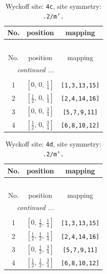 \documentclass[fleqn,8pt]{jsarticle}
\begin{document}
\renewcommand{\arraystretch}{1.2}
\begin{longtable}{ccc}
\caption{Wyckoff site: {\tt 4c}, site symmetry: {\tt .2/m'.}}
 \\
 \hline \hline
No. & position & mapping \\ \hline \endfirsthead

\multicolumn{2}{l}{\tablename\ \thetable{}} \\
 \hline \hline
No. & position & mapping \\ \hline \endhead

 \hline \hline
\multicolumn{2}{r}{\footnotesize\it continued ...} \\ \endfoot

 \hline \hline
\multicolumn{2}{r}{} \\ \endlastfoot

1 & $\left[ 0,\, 0,\, \frac{1}{4} \right]$ & {\tt [1,3,13,15]} \\ \hline
2 & $\left[ \frac{1}{2},\, 0,\, \frac{1}{4} \right]$ & {\tt [2,4,14,16]} \\ \hline
3 & $\left[ 0,\, 0,\, \frac{3}{4} \right]$ & {\tt [5,7,9,11]} \\ \hline
4 & $\left[ \frac{1}{2},\, 0,\, \frac{3}{4} \right]$ & {\tt [6,8,10,12]} \\
\end{longtable}
\renewcommand{\arraystretch}{1.2}
\begin{longtable}{ccc}
\caption{Wyckoff site: {\tt 4d}, site symmetry: {\tt .2/m'.}}
 \\
 \hline \hline
No. & position & mapping \\ \hline \endfirsthead

\multicolumn{2}{l}{\tablename\ \thetable{}} \\
 \hline \hline
No. & position & mapping \\ \hline \endhead

 \hline \hline
\multicolumn{2}{r}{\footnotesize\it continued ...} \\ \endfoot

 \hline \hline
\multicolumn{2}{r}{} \\ \endlastfoot

1 & $\left[ 0,\, \frac{1}{2},\, \frac{1}{4} \right]$ & {\tt [1,3,13,15]} \\ \hline
2 & $\left[ \frac{1}{2},\, \frac{1}{2},\, \frac{1}{4} \right]$ & {\tt [2,4,14,16]} \\ \hline
3 & $\left[ 0,\, \frac{1}{2},\, \frac{3}{4} \right]$ & {\tt [5,7,9,11]} \\ \hline
4 & $\left[ \frac{1}{2},\, \frac{1}{2},\, \frac{3}{4} \right]$ & {\tt [6,8,10,12]} \\
\end{longtable}
\end{document}
